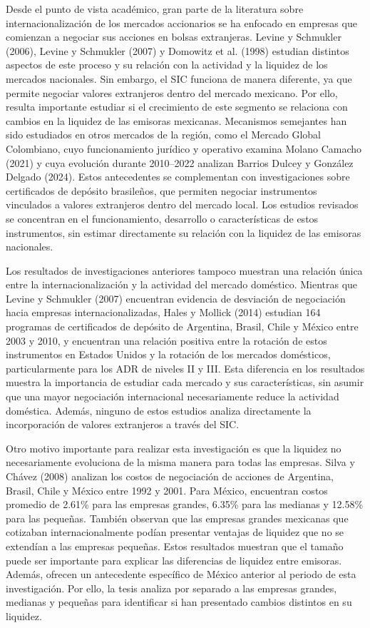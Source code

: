 Desde el punto de vista académico, gran parte de la literatura sobre internacionalización de los mercados accionarios se ha enfocado en empresas que comienzan a negociar sus acciones en bolsas extranjeras. Levine y Schmukler (2006), Levine y Schmukler (2007) y Domowitz et al. (1998) estudian distintos aspectos de este proceso y su relación con la actividad y la liquidez de los mercados nacionales. Sin embargo, el SIC funciona de manera diferente, ya que permite negociar valores extranjeros dentro del mercado mexicano. Por ello, resulta importante estudiar si el crecimiento de este segmento se relaciona con cambios en la liquidez de las emisoras mexicanas. Mecanismos semejantes han sido estudiados en otros mercados de la región, como el Mercado Global Colombiano, cuyo funcionamiento jurídico y operativo examina Molano Camacho (2021) y cuya evolución durante 2010--2022 analizan Barrios Dulcey y González Delgado (2024). Estos antecedentes se complementan con investigaciones sobre certificados de depósito brasileños, que permiten negociar instrumentos vinculados a valores extranjeros dentro del mercado local. Los estudios revisados se concentran en el funcionamiento, desarrollo o características de estos instrumentos, sin estimar directamente su relación con la liquidez de las emisoras nacionales.

Los resultados de investigaciones anteriores tampoco muestran una relación única entre la internacionalización y la actividad del mercado doméstico. Mientras que Levine y Schmukler (2007) encuentran evidencia de desviación de negociación hacia empresas internacionalizadas, Hales y Mollick (2014) estudian 164 programas de certificados de depósito de Argentina, Brasil, Chile y México entre 2003 y 2010, y encuentran una relación positiva entre la rotación de estos instrumentos en Estados Unidos y la rotación de los mercados domésticos, particularmente para los ADR de niveles II y III. Esta diferencia en los resultados muestra la importancia de estudiar cada mercado y sus características, sin asumir que una mayor negociación internacional necesariamente reduce la actividad doméstica. Además, ninguno de estos estudios analiza directamente la incorporación de valores extranjeros a través del SIC.

Otro motivo importante para realizar esta investigación es que la liquidez no necesariamente evoluciona de la misma manera para todas las empresas. Silva y Chávez (2008) analizan los costos de negociación de acciones de Argentina, Brasil, Chile y México entre 1992 y 2001. Para México, encuentran costos promedio de 2.61\% para las empresas grandes, 6.35\% para las medianas y 12.58\% para las pequeñas. También observan que las empresas grandes mexicanas que cotizaban internacionalmente podían presentar ventajas de liquidez que no se extendían a las empresas pequeñas. Estos resultados muestran que el tamaño puede ser importante para explicar las diferencias de liquidez entre emisoras. Además, ofrecen un antecedente específico de México anterior al periodo de esta investigación. Por ello, la tesis analiza por separado a las empresas grandes, medianas y pequeñas para identificar si han presentado cambios distintos en su liquidez.

